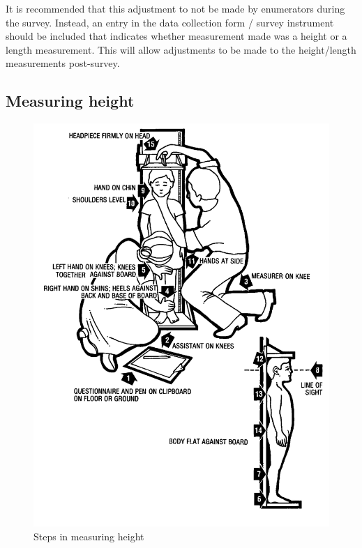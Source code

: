 \documentclass[12pt,]{book}
\theoremstyle{definition}
\theoremstyle{definition}
\theoremstyle{definition}
\theoremstyle{remark}
\begin{document}
It is recommended that this adjustment to not be made by enumerators
during the survey. Instead, an entry in the data collection form /
survey instrument should be included that indicates whether measurement
made was a height or a length measurement. This will allow adjustments
to be made to the height/length measurements post-survey.

\hypertarget{measuring-height}{%
\subsection{Measuring height}\label{measuring-height}}

\begin{figure}

{\centering \includegraphics[width=12.49in]{images/height} 

}

\caption{Steps in measuring height}\label{fig:height06}
\end{figure}
\end{document}
